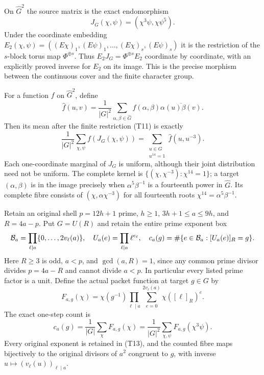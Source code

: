 On $\widehat G^2$ the source matrix is the exact endomorphism
\[
 J_G(\chi,\psi)=(\chi^3\psi,\chi\psi^5).             \tag{T11}
\]
Under the coordinate embedding
$E_2(\chi,\psi)=((E\chi)_1,(E\psi)_1,\ldots,
(E\chi)_s,(E\psi)_s)$ it is the restriction of the $s$-block
torus map $\Phi^{\oplus s}$. Thus $E_2J_G=\Phi^{\oplus s}E_2$
coordinate by coordinate, with an explicitly proved inverse for
$E_2$ on its image. This is the precise morphism between the
continuous cover and the finite character group.

\begin{theorem}
\label{thm:ns-es-packet}
For a function $f$ on $\widehat G^2$, define
\[
 \widehat f(u,v)=\frac1{|G|^2}
   \sum_{\alpha,\beta\in\widehat G}
       f(\alpha,\beta)\overline{\alpha(u)\beta(v)}.
\]
Then its mean after the finite restriction (T11) is exactly
\[
 \frac1{|G|^2}\sum_{\chi,\psi}f(J_G(\chi,\psi))
   =\sum_{\substack{u\in G\\u^{14}=1}}
           \widehat f(u,u^{-3}).                     \tag{T12}
\]
Each one-coordinate marginal of $J_G$ is uniform, although their
joint distribution need not be uniform. The complete kernel is
$\{(\chi,\chi^{-3}):\chi^{14}=1\}$; a target $(\alpha,\beta)$
is in the image precisely when $\alpha^5\beta^{-1}$ is a
fourteenth power in $\widehat G$. Its complete fibre consists of
$(\chi,\alpha\chi^{-3})$ for all fourteenth roots
$\chi^{14}=\alpha^5\beta^{-1}$.

Retain an original shell $p=12h+1$ prime, $h\geq1$,
$3h+1\leq a\leq9h$, and $R=4a-p$. Put $G=U(R)$ and retain
the entire prime exponent box
\[
 {\cal B}_a=\prod_{\ell\mid a}\{0,\ldots,2v_\ell(a)\},\quad
 U_a(e)=\prod_{\ell\mid a}\ell^{e_\ell},\quad
 c_a(g)=\#\{e\in{\cal B}_a:[U_a(e)]_R=g\}.
\]
Here $R\geq3$ is odd, $a<p$, and $\gcd(a,R)=1$, since any
common prime divisor divides $p=4a-R$ and cannot divide $a<p$.
In particular every listed prime factor is a unit. Define the
actual packet function at target $g\in G$ by
\[
 F_{a,g}(\chi)=\chi(g^{-1})
       \prod_{\ell\mid a}\sum_{e=0}^{2v_\ell(a)}\chi([\ell]_R)^e.
                                                               \tag{T13}
\]
The exact one-step count is
\[
 c_a(g)=\frac1{|G|}\sum_\chi F_{a,g}(\chi)
       =\frac1{|G|^2}\sum_{\chi,\psi}F_{a,g}(\chi^3\psi).
                                                               \tag{T14}
\]
Every original exponent is retained in (T13), and the counted
fibre maps bijectively to the original divisors of $a^2$ congruent
to $g$, with inverse $u\mapsto(v_\ell(u))_{\ell\mid a}$.


\end{theorem}
